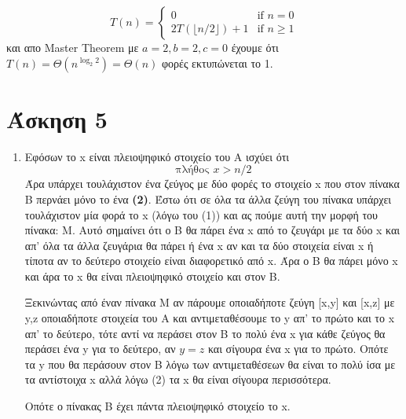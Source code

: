 \documentclass[a4paper,10pt]{article}
\begin{document}
\begin{flushleft}
\begin{enumerate}
        \begin{equation*}
            T(n) = 
            \begin{cases}
            0 & \text{if } n = 0 \\
            2T(\lfloor n/2 \rfloor) + 1 & \text{if } n \geq 1
            \end{cases}
        \end{equation*}
        και απο Master Theorem με $a=2, b=2, c=0$ έχουμε ότι $T(n) = \Theta(n^{\log_2{2}}) = \Theta(n)$ φορές εκτυπώνεται το 1.
    \end{enumerate}

    \newpage
    \section*{Άσκηση 5}
    \begin{enumerate}
        \item Εφόσων το x είναι πλειοψηφικό στοιχείο του Α ισχύει ότι
        \begin{equation}
            \text{πλήθος } x > n/2
        \end{equation}
        Άρα υπάρχει τουλάχιστον ένα ζεύγος με δύο φορές το στοιχείο x που στον πίνακα Β περνάει μόνο το ένα \textbf{(2)}.
        Έστω ότι σε όλα τα άλλα ζεύγη του πίνακα υπάρχει τουλάχιστον μία φορά το x (λόγω του (1)) και ας πούμε αυτή την μορφή του πίνακα: Μ. Αυτό σημαίνει ότι ο Β θα πάρει ένα x από το ζευγάρι με τα δύο x και απ' όλα τα άλλα ζευγάρια θα πάρει ή ένα x αν και τα δύο στοιχεία είναι x ή τίποτα αν το δεύτερο στοιχείο είναι διαφορετικό από x. Άρα ο Β θα πάρει μόνο x και άρα το x θα είναι πλειοψηφικό στοιχείο και στον Β.

        Ξεκινώντας από έναν πίνακα Μ αν πάρουμε οποιαδήποτε ζεύγη [x,y] και [x,z] με y,z οποιαδήποτε στοιχεία του Α και αντιμεταθέσουμε το y απ' το πρώτο και το x απ' το δεύτερο, τότε αντί να περάσει στον Β το πολύ ένα x για κάθε ζεύγος θα περάσει ένα y για το δεύτερο, αν $y=z$ και σίγουρα ένα x για το πρώτο. Οπότε τα y που θα περάσουν στον B λόγω των αντιμεταθέσεων θα είναι το πολύ ίσα με τα αντίστοιχα x αλλά λόγω (2) τα x θα είναι σίγουρα περισσότερα.

        Οπότε ο πίνακας B έχει πάντα πλειοψηφικό στοιχείο το x.
    \end{enumerate}
\end{flushleft}
\end{document}
